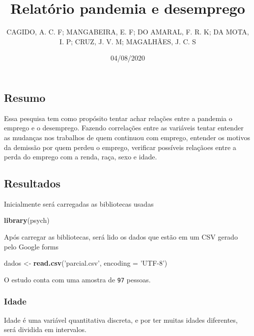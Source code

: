 \documentclass[
]{article}
\title{Relatório pandemia e desemprego}
\author{CAGIDO, A. C. F; MANGABEIRA, E. F; DO AMARAL, F. R. K; DA MOTA, I. P;
CRUZ, J. V. M; MAGALHÃES, J. C. S}
\date{04/08/2020}
\newenvironment{Shaded}{\begin{snugshade}}{\end{snugshade}}
\newcommand{\DataTypeTok}[1]{\textcolor[rgb]{0.13,0.29,0.53}{#1}}
\newcommand{\KeywordTok}[1]{\textcolor[rgb]{0.13,0.29,0.53}{\textbf{#1}}}
\newcommand{\NormalTok}[1]{#1}
\newcommand{\StringTok}[1]{\textcolor[rgb]{0.31,0.60,0.02}{#1}}
\begin{document}
\maketitle

\hypertarget{resumo}{%
\subsection{Resumo}\label{resumo}}

Essa pesquisa tem como propósito tentar achar relações entre a pandemia
o emprego e o desemprego. Fazendo correlações entre as variáveis tentar
entender as mudanças nos trabalhos de quem continuou com emprego,
entender os motivos da demissão por quem perdeu o emprego, verificar
possíveis relaçãoes entre a perda do emprego com a renda, raça, sexo e
idade.

\hypertarget{resultados}{%
\subsection{Resultados}\label{resultados}}

Inicialmente será carregadas as bibliotecas usadas

\begin{Shaded}
\begin{Highlighting}[]
\KeywordTok{library}\NormalTok{(psych)}
\end{Highlighting}
\end{Shaded}

Após carregar as bibliotecas, será lido os dados que estão em um CSV
gerado pelo Google forms

\begin{Shaded}
\begin{Highlighting}[]
\NormalTok{dados <-}\StringTok{ }\KeywordTok{read.csv}\NormalTok{(}\StringTok{'parcial.csv'}\NormalTok{, }\DataTypeTok{encoding =} \StringTok{'UTF-8'}\NormalTok{)}
\end{Highlighting}
\end{Shaded}

O estudo conta com uma amostra de \texttt{97} pessoas.

\hypertarget{idade}{%
\subsubsection{Idade}\label{idade}}

Idade é uma variável quantitativa discreta, e por ter muitas idades
diferentes, será dividida em intervalos.
\end{document}
